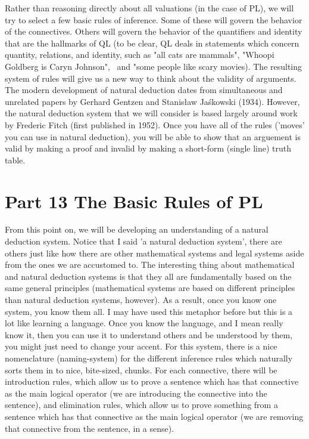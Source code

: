 Rather than reasoning directly about all valuations (in the case of PL), we will try to select a few basic rules of inference. Some of these will govern the behavior of the connectives. Others will govern the behavior of the quantifiers and identity that are the hallmarks of QL (to be clear, QL deals in statements which concern quantity, relations, and identity, such as "all cats are mammals", "Whoopi Goldberg is Caryn Johnson",  and "some people like scary movies). The resulting system of rules will give us a new way to think about the validity of arguments. The modern development of natural deduction dates from simultaneous and unrelated papers by Gerhard Gentzen and Stanisław Jaśkowski (1934). However, the natural deduction system that we will consider is based largely around work by Frederic Fitch (first published in 1952). Once you have all of the rules ('moves' you can use in natural deduction), you will be able to show that an arguement is valid by making a proof and invalid by making a short-form (single line) truth table. 


\chapter{Part 13 The Basic Rules of PL}
From this point on, we will be developing an understanding of a natural deduction system. Notice that I said 'a natural deduction system', there are others just like how there are other mathematical systems and legal systems aside from the ones we are accustomed to. The interesting thing about mathematical and natural deduction systems is that they all are fundamentally based on the same general principles (mathematical systems are based on different principles than natural deduction systems, however). As a result, once you know one system, you know them all. I may have used this metaphor before but this is a lot like learning a language. Once you know the language, and I mean really know it, then you can use it to understand others and be understood by them, you might just need to change your accent. For this system, there is a nice nomenclature (naming-system) for the different inference rules which naturally sorts them in to nice, bite-sized, chunks. For each connective, there will be introduction rules, which allow us to prove a sentence which has that connective as the main logical operator (we are introducing the connective into the sentence), and elimination rules, which allow us to prove something from a sentence which has that connective as the main logical operator (we are removing that connective from the sentence, in a sense).

